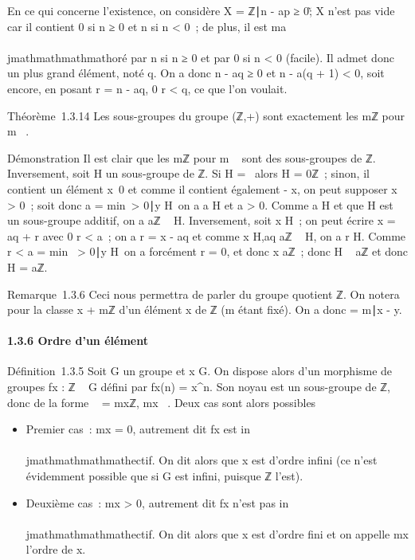 En ce qui concerne l'existence, on considère X = \p \in
ℤ∣n - ap ≥ 0\~; X n'est pas
vide car il contient 0 si n ≥ 0 et n si n \textless{} 0~; de plus, il
est ma\\\\jmathmathmathmathoré par n si n ≥ 0 et par 0 si n \textless{} 0 (facile). Il admet
donc un plus grand élément, noté q. On a donc n - aq ≥ 0 et n - a(q + 1)
\textless{} 0, soit encore, en posant r = n - aq, 0 \leq r \textless{} q,
ce que l'on voulait.

Théorème~1.3.14 Les sous-groupes du groupe (ℤ,+) sont exactement les mℤ
pour m \in {}~.

Démonstration Il est clair que les mℤ pour m \in {}~ sont des sous-groupes
de ℤ. Inversement, soit H un sous-groupe de ℤ. Si H =
\0\, alors H = 0ℤ~; sinon, il contient
un élément x\neq~0 et comme il contient également
- x, on peut supposer x \textgreater{} 0~; soit donc a
= min~\y \textgreater{}
0∣y \in H\, on a a \in H et a
\textgreater{} 0. Comme a \in H et que H est un sous-groupe additif, on a
aℤ \subset~ H. Inversement, soit x \in H~; on peut écrire x = aq + r avec 0 \leq r
\textless{} a~; on a r = x - aq et comme x \in H,aq \in aℤ \subset~ H, on a r \in H.
Comme r \textless{} a = min~\y
\textgreater{} 0∣y \in H\, on
a forcément r = 0, et donc x \in aℤ~; donc H \subset~ aℤ et donc H = aℤ.

Remarque~1.3.6 Ceci nous permettra de parler du groupe quotient ℤ. On
notera \overlinex pour la classe x + mℤ d'un élément
x de ℤ (m étant fixé). On a donc \overlinex =
\overliney \Leftrightarrow
m∣x - y.

\paragraph{1.3.6 Ordre d'un élément}

Définition~1.3.5 Soit G un groupe et x \in G. On dispose alors d'un
morphisme de groupes fx : ℤ \rightarrow~ G défini par fx(n) =
x^n. Son noyau est un sous-groupe de ℤ, donc de la forme
\mathrmKerfx~ =
mxℤ, mx \in {}~. Deux cas sont alors possibles

\begin{itemize}
\itemsep1pt\parskip0pt
\item
  Premier cas~: mx = 0, autrement dit fx est
  in\\\\jmathmathmathmathectif. On dit alors que x est d'ordre infini (ce n'est évidemment
  possible que si G est infini, puisque ℤ l'est).
\item
  Deuxième cas~: mx \textgreater{} 0, autrement dit
  fx n'est pas in\\\\jmathmathmathmathectif. On dit alors que x est d'ordre fini
  et on appelle mx l'ordre de x.
\end{itemize}

